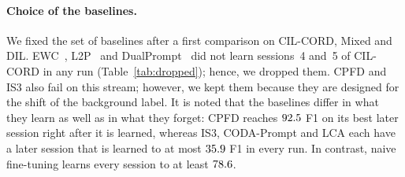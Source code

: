 \paragraph{Choice of the baselines.} We fixed the set of baselines after a first comparison
on CIL-CORD, Mixed and DIL. EWC~\citep{kirkpatrick2017ewc}, L2P~\citep{wang2022l2p} and
DualPrompt~\citep{wang2022dualprompt} did not learn sessions~4 and~5 of CIL-CORD in any
run (Table~\ref{tab:dropped}); hence, we dropped them. CPFD and IS3 also fail on this
stream; however, we kept them because they are designed for the shift of the background
label. It is noted that the baselines differ in what they learn as well as in what they
forget: CPFD reaches $92.5$ F1 on its best later session right after it is
learned, whereas IS3, CODA-Prompt and LCA each have a later session that is learned to at
most $35.9$ F1 in every run. In contrast, naive fine-tuning learns every
session to at least $78.6$.

\begin{table}[!htbp]
  \centering
  \caption[Baselines that were dropped]{\textbf{Baselines that were dropped} (CIL-CORD,
  first comparison, earlier protocol; AA per run). Unlearned sessions: the sessions whose
  F1 right after training stays near zero.}
  \label{tab:dropped}
  \small
\end{table}
